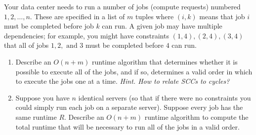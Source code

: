 \documentclass{article}
\begin{document}
    \begin{exercise}
      Your data center needs to run a number of jobs (compute requests) numbered $1, 2, \dots, n$. These are specified in a list of $m$ tuples where $(i, k)$ means that job $i$ must be completed before job $k$ can run. A given job may have multiple dependencies; for example, you might have constraints $(1, 4), (2, 4), (3, 4)$ that all of jobs $1, 2, \mbox{ and } 3$ must be completed before $4$ can run.
      \begin{enumerate}
        \item Describe an $O(n+m)$ runtime algorithm that determines whether it is possible to execute all of the jobs, and if so, determines a valid order in which to execute the jobs one at a time. \textit{Hint. How to relate SCCs to cycles?}
        \item Suppose you have $n$ identical servers (so that if there were no constraints you could simply run each job on a separate server). Suppose every job has the same runtime $R$. Describe an $O(n+m)$ runtime algorithm to compute the total runtime that will be necessary to run all of the jobs in a valid order.
      \end{enumerate}
    \end{exercise}
\end{document}
